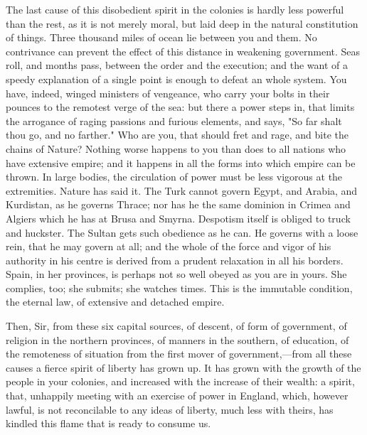 The last cause of this disobedient spirit in the colonies is hardly less powerful than the rest, as it is not merely moral, but laid deep in the natural constitution of things. Three thousand miles of ocean lie between you and them. No contrivance can prevent the effect of this distance in weakening government. Seas roll, and months pass, between the order and the execution; and the want of a speedy explanation of a single point is enough to defeat an whole system. You have, indeed, winged ministers of vengeance, who carry your bolts in their pounces to the remotest verge of the sea: but there a power steps in, that limits the arrogance of raging passions and furious elements, and says, "So far shalt thou go, and no farther." Who are you, that should fret and rage, and bite the chains of Nature? Nothing worse happens to you than does to all nations who have extensive empire; and it happens in all the forms into which empire can be thrown. In large bodies, the circulation of power must be less vigorous at the extremities. Nature has said it. The Turk cannot govern Egypt, and Arabia, and Kurdistan, as he governs Thrace; nor has he the same dominion in Crimea and Algiers which he has at Brusa and Smyrna. Despotism itself is obliged to truck and huckster. The Sultan gets such obedience as he can. He governs with a loose rein, that he may govern at all; and the whole of the force and vigor of his authority in his centre is derived from a prudent relaxation in all his borders. Spain, in her provinces, is perhaps not so well obeyed as you are in yours. She complies, too; she submits; she watches times. This is the immutable condition, the eternal law, of extensive and detached empire.

Then, Sir, from these six capital sources, of descent, of form of government, of religion in the northern provinces, of manners in the southern, of education, of the remoteness of situation from the first mover of government,—from all these causes a fierce spirit of liberty has grown up. It has grown with the growth of the people in your colonies, and increased with the increase of their wealth: a spirit, that, unhappily meeting with an exercise of power in England, which, however lawful, is not reconcilable to any ideas of liberty, much less with theirs, has kindled this flame that is ready to consume us.

